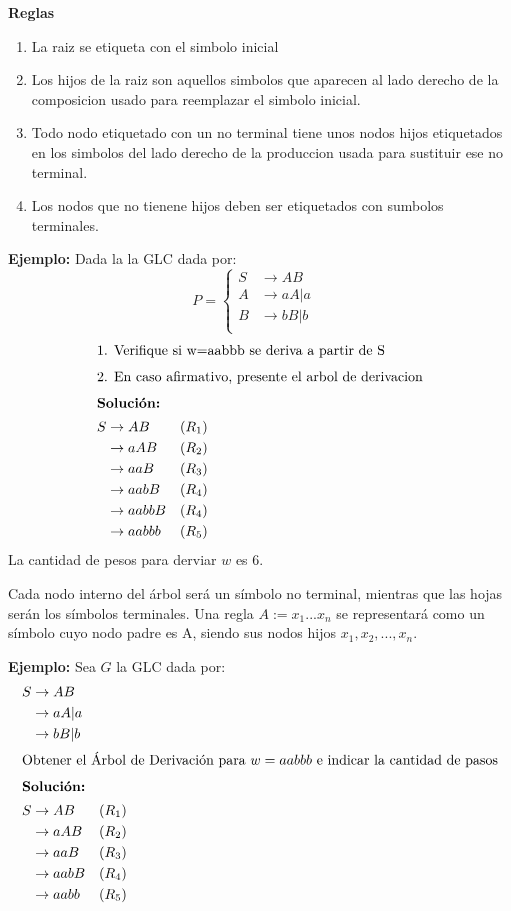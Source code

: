 \textbf{Reglas}

\begin{enumerate}
    \item La raiz se etiqueta con el simbolo inicial
    \item Los hijos de la raiz son aquellos simbolos que aparecen al lado derecho de la composicion usado para reemplazar el simbolo inicial.
    \item Todo nodo etiquetado con un no terminal tiene unos nodos hijos etiquetados en los simbolos del lado derecho de la produccion usada para sustituir ese no terminal.
    \item Los nodos que no tienene hijos deben ser etiquetados con sumbolos terminales.
\end{enumerate}


\textbf{Ejemplo: }Dada la la GLC dada por:
  \[
    P=\left\{
                \begin{array}{lll}
                    S	&\rightarrow AB		& \\
                    A	&\rightarrow aA|a	& \\
                    B	&\rightarrow bB|b	& \\
                \end{array}
              \right.
  \]
\begin{align*}
\intertext{1. Verifique si w=aabbb se deriva a partir de S}
\intertext{2. En caso afirmativo, presente el arbol de derivacion}
\intertext{\textbf{Solución: }}
S	&\rightarrow AB		&(R_1)	\\
	&\rightarrow aAB	&(R_2)	\\
	&\rightarrow aaB	&(R_3)	\\
	&\rightarrow aabB	&(R_4)	\\
	&\rightarrow aabbB	&(R_4)	\\
	&\rightarrow aabbb	&(R_5)	\\
\end{align*}
La cantidad de pesos para derviar $w$ es 6.

Cada nodo interno del árbol será un símbolo no terminal, mientras que las hojas serán los símbolos terminales. Una regla $A:= x_1...x_n$ se representará como un símbolo cuyo nodo padre es A, siendo sus nodos hijos $x_1,x_2,...,x_n$.

\textbf{Ejemplo: }Sea $G$ la GLC dada por:
\begin{align*}
S	&\rightarrow AB		& \\
	&\rightarrow aA|a	& \\
	&\rightarrow bB|b	& \\
\intertext{Obtener el Árbol de Derivación para $w=aabbb$ e indicar la cantidad de pasos}
\intertext{\textbf{Solución: }}
S	&\rightarrow AB		&(R_1)	\\
	&\rightarrow aAB	&(R_2)	\\
	&\rightarrow aaB	&(R_3)	\\
	&\rightarrow aabB	&(R_4)	\\
	&\rightarrow aabb	&(R_5)	\\
\end{align*}

